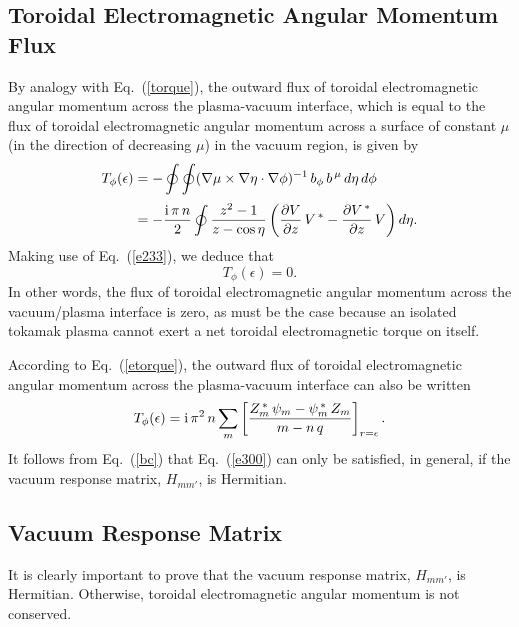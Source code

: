 \documentclass[12pt,prb,aps]{revtex4-1}
\begin{document}
\subsection{Toroidal Electromagnetic Angular Momentum Flux}
By analogy with Eq.~(\ref{torque}), the outward flux of toroidal electromagnetic angular momentum across the plasma-vacuum interface,
which is equal to the flux of  toroidal electromagnetic angular momentum across a surface of constant $\mu$ (in the direction of
decreasing $\mu$) in the vacuum region, is given by 
\begin{align}
T_\phi(\epsilon) &= -\oint\oint (\nabla\mu\times \nabla\eta\cdot\nabla\phi)^{-1}\,b_\phi\,b^{\,\mu}\,d\eta\,d\phi\nonumber\\[0.5ex]
&= -\frac{{\rm i}\,\pi\,n}{2}\oint \frac{z^2-1}{z-\cos\eta}\left(\frac{\partial V}{\partial z}\,V^{\,\ast}-\frac{\partial V^{\,\ast}}{\partial z}\,V\right)d\eta.
\end{align}
Making use of Eq.~(\ref{e233}), we deduce that 
\begin{equation}\label{e300}
T_\phi(\epsilon)=0.
\end{equation}
In other words, the flux of toroidal  electromagnetic angular momentum across the vacuum/plasma interface is zero, as must be the
case because an isolated tokamak plasma cannot exert a net toroidal electromagnetic torque on itself.\cite{am1}

According to Eq.~(\ref{etorque}), the outward flux of toroidal electromagnetic angular momentum across the plasma-vacuum interface can also be written
\begin{equation}
T_\phi(\epsilon) = {\rm i}\,\pi^2\,n\sum_m\left[\frac{Z_m^{\,\ast}\,\psi_m-\psi_m^{\,\ast}\,Z_m}{m-n\,q}\right]_{r=\epsilon}.
\end{equation}
It follows from Eq.~(\ref{bc}) that Eq.~(\ref{e300}) can only be satisfied, in general, if the vacuum
response matrix, $H_{mm'}$, is Hermitian. 

\subsection{Vacuum Response Matrix}\label{svacsoln1}
It is clearly important to prove that the vacuum response matrix, $H_{mm'}$,   is Hermitian. Otherwise, toroidal electromagnetic
angular momentum is not conserved. 
\end{document}
